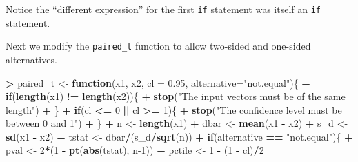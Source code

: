\documentclass[
]{krantz}
\makeatletter
\newenvironment{Shaded}{\begin{snugshade}}{\end{snugshade}}
\newcommand{\ControlFlowTok}[1]{\textcolor[rgb]{0.27,0.27,0.27}{\textbf{#1}}}
\newcommand{\DataTypeTok}[1]{\textcolor[rgb]{0.27,0.27,0.27}{#1}}
\newcommand{\DecValTok}[1]{\textcolor[rgb]{0.06,0.06,0.06}{#1}}
\newcommand{\FloatTok}[1]{\textcolor[rgb]{0.06,0.06,0.06}{#1}}
\newcommand{\KeywordTok}[1]{\textcolor[rgb]{0.27,0.27,0.27}{\textbf{#1}}}
\newcommand{\NormalTok}[1]{#1}
\newcommand{\OperatorTok}[1]{\textcolor[rgb]{0.43,0.43,0.43}{\textbf{#1}}}
\newcommand{\StringTok}[1]{\textcolor[rgb]{0.5,0.5,0.5}{#1}}
\newenvironment{kframe}{%
\medskip{}
\setlength{\fboxsep}{.8em}
 \def\at@end@of@kframe{}%
 \ifinner\ifhmode%
  \def\at@end@of@kframe{\end{minipage}}%
  \begin{minipage}{\columnwidth}%
 \fi\fi%
 \def\FrameCommand##1{\hskip\@totalleftmargin \hskip-\fboxsep
 \colorbox{shadecolor}{##1}\hskip-\fboxsep
     \hskip-\linewidth \hskip-\@totalleftmargin \hskip\columnwidth}%
 \MakeFramed {\advance\hsize-\width
   \@totalleftmargin\z@ \linewidth\hsize
   \@setminipage}}%
 {\par\unskip\endMakeFramed%
 \at@end@of@kframe}
\renewenvironment{Shaded}{\begin{kframe}}{\end{kframe}}
\makeatother
\begin{document}
Notice the ``different expression'' for the first \texttt{if} statement was itself an \texttt{if} statement.

Next we modify the \texttt{paired\_t} function to allow two-sided and one-sided alternatives.

\begin{Shaded}
\begin{Highlighting}[]
\OperatorTok{\textgreater{}}\StringTok{ }\NormalTok{paired\_t \textless{}{-}}\StringTok{ }\ControlFlowTok{function}\NormalTok{(x1, x2, }\DataTypeTok{cl =} \FloatTok{0.95}\NormalTok{, }\DataTypeTok{alternative=}\StringTok{"not.equal"}\NormalTok{)\{}
\OperatorTok{+}\StringTok{     }\ControlFlowTok{if}\NormalTok{(}\KeywordTok{length}\NormalTok{(x1) }\OperatorTok{!=}\StringTok{ }\KeywordTok{length}\NormalTok{(x2))\{}
\OperatorTok{+}\StringTok{         }\KeywordTok{stop}\NormalTok{(}\StringTok{"The input vectors must be of the same length"}\NormalTok{)}
\OperatorTok{+}\StringTok{         }\NormalTok{\}}
\OperatorTok{+}\StringTok{     }\ControlFlowTok{if}\NormalTok{(cl }\OperatorTok{\textless{}=}\StringTok{ }\DecValTok{0} \OperatorTok{||}\StringTok{ }\NormalTok{cl }\OperatorTok{\textgreater{}=}\StringTok{ }\DecValTok{1}\NormalTok{)\{}
\OperatorTok{+}\StringTok{         }\KeywordTok{stop}\NormalTok{(}\StringTok{"The confidence level must be between 0 and 1"}\NormalTok{)}
\OperatorTok{+}\StringTok{         }\NormalTok{\}}
\OperatorTok{+}\StringTok{     }\NormalTok{n \textless{}{-}}\StringTok{ }\KeywordTok{length}\NormalTok{(x1)}
\OperatorTok{+}\StringTok{     }\NormalTok{dbar \textless{}{-}}\StringTok{ }\KeywordTok{mean}\NormalTok{(x1 }\OperatorTok{{-}}\StringTok{ }\NormalTok{x2)}
\OperatorTok{+}\StringTok{     }\NormalTok{s\_d \textless{}{-}}\StringTok{ }\KeywordTok{sd}\NormalTok{(x1 }\OperatorTok{{-}}\StringTok{ }\NormalTok{x2)}
\OperatorTok{+}\StringTok{     }\NormalTok{tstat \textless{}{-}}\StringTok{ }\NormalTok{dbar}\OperatorTok{/}\NormalTok{(s\_d}\OperatorTok{/}\KeywordTok{sqrt}\NormalTok{(n))}
\OperatorTok{+}\StringTok{     }\ControlFlowTok{if}\NormalTok{(alternative }\OperatorTok{==}\StringTok{ "not.equal"}\NormalTok{)\{}
\OperatorTok{+}\StringTok{         }\NormalTok{pval \textless{}{-}}\StringTok{ }\DecValTok{2}\OperatorTok{*}\NormalTok{(}\DecValTok{1} \OperatorTok{{-}}\StringTok{ }\KeywordTok{pt}\NormalTok{(}\KeywordTok{abs}\NormalTok{(tstat), n}\DecValTok{{-}1}\NormalTok{))}
\OperatorTok{+}\StringTok{         }\NormalTok{pctile \textless{}{-}}\StringTok{ }\DecValTok{1} \OperatorTok{{-}}\StringTok{ }\NormalTok{(}\DecValTok{1} \OperatorTok{{-}}\StringTok{ }\NormalTok{cl)}\OperatorTok{/}\DecValTok{2}

\end{Highlighting}
\end{Shaded}
\end{document}
